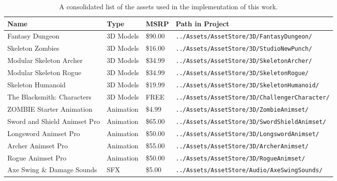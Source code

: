 \begin{table}[!h]
  \begin{center}
    \caption{A consolidated list of the assets used in the implementation of this work.}
    \label{tab:table-game-assets}
    \begin{tabular}{ >{\small}w{l}{11em} >{\small}w{c}{4em} >{\small}w{c}{3em} m{13em} } %
      \addlinespace
      \toprule
      \textbf{Name}                & \bf Type  & \bf MSRP & \textbf{\small Path in Project}                             \\
      \midrule
      Fantasy Dungeon              & 3D Models &  \$90.00 & \texttt{\tiny ../Assets/AssetStore/3D/FantasyDungeon/}      \\ 
      Skeleton Zombies             & 3D Models &  \$16.00 & \texttt{\tiny ../Assets/AssetStore/3D/StudioNewPunch/}      \\
      Modular Skeleton Archer      & 3D Models &  \$34.99 & \texttt{\tiny ../Assets/AssetStore/3D/SkeletonArcher/}      \\
      Modular Skeleton Rogue       & 3D Models &  \$34.99 & \texttt{\tiny ../Assets/AssetStore/3D/SkeletonRogue/}       \\
      Skeleton Humanoid            & 3D Models &  \$19.99 & \texttt{\tiny ../Assets/AssetStore/3D/SkeletonHumanoid/}    \\
      The Blacksmith: Characters   & 3D Models &     FREE & \texttt{\tiny ../Assets/AssetStore/3D/ChallengerCharacter/} \\
      \midrule
      ZOMBIE Starter Animation     & Animation &   \$4.99 & \texttt{\tiny ../Assets/AssetStore/3D/ZombieAnimset/}      \\
      Sword and Shield Animset Pro & Animation &  \$65.00 & \texttt{\tiny ../Assets/AssetStore/3D/SwordShieldAnimset/} \\
      Longsword Animset Pro        & Animation &  \$50.00 & \texttt{\tiny ../Assets/AssetStore/3D/LongswordAnimset/}   \\
      Archer Animset Pro           & Animation &  \$55.00 & \texttt{\tiny ../Assets/AssetStore/3D/ArcherAnimset/}      \\
      Rogue Animset Pro            & Animation &  \$50.00 & \texttt{\tiny ../Assets/AssetStore/3D/RogueAnimset/}      \\
      \midrule
      Axe Swing \& Damage Sounds   & SFX       &   \$5.00 & \texttt{\tiny ../Assets/AssetStore/Audio/AxeSwingSounds/}   \\

\end{tabular}
\end{center}
\end{table}
